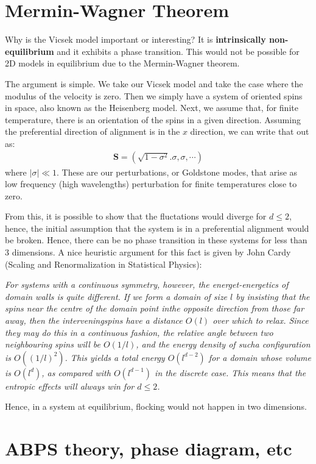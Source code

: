 \documentclass[a4paper]{article}
\begin{document}
\section{Mermin-Wagner Theorem}

Why is the Vicsek model important or interesting? It is \textbf{intrinsically non-equilibrium} and it exhibits a phase transition. This would not be possible for 2D models in equilibrium due to the Mermin-Wagner theorem.

The argument is simple. We take our Vicsek model and take the case where the modulus of the velocity is zero. Then we simply have a system of oriented spins in space, also known as the Heisenberg model. Next, we assume that, for finite temperature, there is an orientation of the spins in a given direction. Assuming the preferential direction of alignment is in the $x$ direction, we can write that out as:
%
\begin{align}
	\mathbf{S} = (\sqrt{1-\sigma^2}. \sigma, \sigma, \cdots)
\end{align}
%
where $|\sigma| \ll 1$. These are our perturbations, or Goldstone modes, that arise as low frequency (high wavelengths) perturbation for finite temperatures close to zero. 

From this, it is possible to show that the fluctations would diverge for $d\leq 2$, hence, the initial assumption that the system is in a preferential alignment would be broken. Hence, there can be no phase transition in these systems for less than 3 dimensions. A nice heuristic argument for this fact is given by John Cardy (Scaling and Renormalization in Statistical Physics):

\textit{For systems with a continuous symmetry, however, the energet-energetics of domain walls is quite different. If we form a domain of size $l$ by insisting that the spins near the centre of the domain point inthe opposite direction from those far away, then the interveningspins have a distance $O(l)$ over which to relax. Since they may do this in a continuous fashion, the relative angle between two neighbouring spins will be $O(1/l)$, and the energy density of sucha configuration is $O((1/l)^2)$. This yields a total energy $O(l^{d-2})$ for a domain whose volume is $O(l^d)$, as compared with $O(l^{d-1})$ in the discrete case. This means that the entropic effects will always win for $d\leq 2$.
}

Hence, in a system at equilibrium, flocking would not happen in two dimensions.


\section{ABPS theory, phase diagram, etc}
\end{document}
